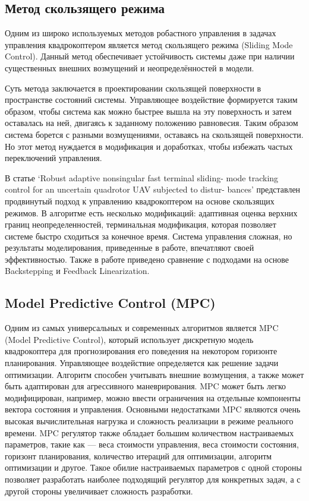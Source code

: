 \subsection{Метод скользящего режима}

Одним из широко используемых методов робастного управления в задачах управления квадрокоптером является 
метод скользящего режима (Sliding Mode Control). 
Данный метод обеспечивает устойчивость системы даже при наличии 
существенных внешних возмущений и неопределённостей в модели.

Суть метода заключается в проектировании скользящей поверхности в пространстве состояний системы. 
Управляющее воздействие формируется таким образом, чтобы система как можно быстрее вышла на эту поверхность 
и затем оставалась на ней, двигаясь к заданному положению равновесия. 
Таким образом система борется с разными возмущениями, оставаясь на скользящей поверхности.
Но этот метод нуждается в модификация и доработках, чтобы избежать частых переключений управления.

В статье `Robust adaptive nonsingular fast terminal sliding-
mode tracking control for an uncertain quadrotor UAV subjected to distur-
bances' представлен продвинутый подход к управлению квадрокоптером на
основе скользящих режимов\cite{AdaptiveSlidingMode}. В алгоритме есть несколько модификаций: адаптивная оценка верхних 
границ неопределенностей, терминальная модификация, которая позволяет системе быстро сходиться за конечное время. 
Система управления сложная, но результаты моделирования, приведенные в работе, впечатляют своей эффективностью. Также 
в работе приведено сравнение с подходами на основе Backstepping и Feedback Linearization.




\subsection{Model Predictive Control (MPC)}

Одним из самых универсальных и современных алгоритмов является MPC (Model Predictive Control), который
использует дискретную модель квадрокоптера для прогнозирования его поведения на некотором горизонте планирования. 
Управляющее воздействие определяется как решение задачи оптимизации.
Алгоритм способен учитывать внешние возмущения, а также может быть адаптирован для агрессивного маневрирования. 
MPC может быть легко модифицирован, например, можно ввести ограничения на отдельные компоненты вектора состояния и 
управления.
Основными недостатками MPC являются очень высокая вычислительная нагрузка и сложность реализации в режиме реального времени.
MPC регулятор также обладает большим количеством настраиваемых параметров, такие как --- 
веса стоимости управления, веса стоимости состояния, горизонт планирования, количество итераций для оптимизации, 
алгоритм оптимизации и другое. Такое обилие настраиваемых параметров с одной стороны позволяет
разработать наиболее подходящий регулятор для конкретных задач, а с другой стороны увеличивает сложность разработки.


